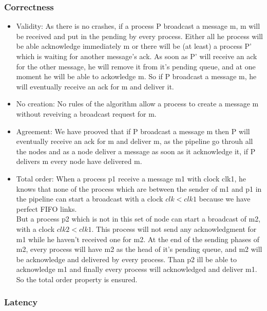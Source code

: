 \documentclass[a4paper]{article}
\begin{document}
\subsubsection{Correctness}
\begin{itemize}
    \item Validity: As there  is no crashes, if a process P broadcast a
        message m, m will be received and put in the pending by every
        process. Either all he process will be able acknowledge immediately m 
        or there will be (at least) a process P' which is waiting for another message's ack.
        As soon as P' will receive an ack for the other message, he will remove it from it's
        pending queue, and at one moment he will be able to ackowledge m. 
        So if P broadcast a message m, he will eventually receive an ack
        for m and deliver it.
    \item No creation: No rules of the algorithm allow a process to
        create a message m without reveiving a broadcast request for m.
    \item Agreement: We have prooved that if P broadcast a message m
        then P will eventually receive an ack for m and deliver m, as
        the pipeline go throuh all the nodes and as a node deliver a
        message as soon as it acknowledge it, if P delivers m every node
        have delivered m.
    \item Total order: When a process p1 receive a message m1 with
        clock clk1, he knows
        that none of the process which are between the sender of m1 and p1
        in the pipeline can start a broadcast with a clock $clk<clk1$
        because we have perfect FIFO links.\\
        But a process p2 which is not in this set of node can start a
        broadcast of m2, with a clock $clk2<clk1$. This process will not send
        any acknowledgment for m1 while he haven't received one for m2.
        At the end of the sending phases of m2, every process will have
        m2 as the head of it's pending queue, and m2 will be acknowledge
        and delivered by every process. Than p2 ill be able to
        acknowledge m1 and finally every process will acknowledged and
        deliver m1. So the total order property is ensured.
\end{itemize}
\label{sec:pipelineack-proof}


\subsubsection*{Latency}
\end{document}
